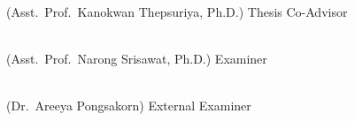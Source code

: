 \noindent
\begin{minipage}{\textwidth}
\hspace{2cm}\hrulefill\\
\hspace{2cm} (Asst.\ Prof.\ Kanokwan Thepsuriya, Ph.D.) \hfill Thesis Co-Advisor
\end{minipage}
\par
\vspace{0.8cm}

\noindent
\begin{minipage}{\textwidth}
\hspace{2cm}\hrulefill\\
\hspace{2cm} (Asst.\ Prof.\ Narong Srisawat, Ph.D.) \hfill Examiner
\end{minipage}
\par
\vspace{0.8cm}

\noindent
\begin{minipage}{\textwidth}
\hspace{2cm}\hrulefill\\
\hspace{2cm} (Dr.\ Areeya Pongsakorn) \hfill External Examiner
\end{minipage}


